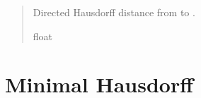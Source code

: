 \documentclass[letterpaper,10pt,english]{sphinxmanual}
\begin{document}
\begin{fulllineitems}
\begin{fulllineitems}
\begin{quote}
\begin{description}
\begin{itemize}
\end{itemize}

\sphinxAtStartPar
Directed Hausdorff distance from  to .

\sphinxAtStartPar
float

\end{description}\end{quote}

\end{fulllineitems}


\end{fulllineitems}



\section{Minimal Hausdorff}
\label{\detokenize{core/index:minimal-hausdorff}}
\end{document}
